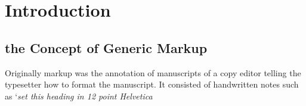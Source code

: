 \documentclass[a4paper]{tutorial}
\begin{document}
\chapter{Introduction}

\section{the Concept of Generic Markup}
Originally markup was the annotation of manuscripts of a copy editor telling
the typesetter how to format the manuscript. It consisted of handwritten notes
such as ‘\emph{set this heading in 12 point Helvetica}
\end{document}
